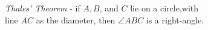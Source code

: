 \documentclass[preview]{standalone}
\begin{document}
\begin{center}
\textit{Thales' Theorem} - if $A,B$, and $C$ lie on a circle,with \\line $\overline{AC}$ as the diameter, then $\angle ABC$ is a right-angle.
\end{center}
\end{document}
